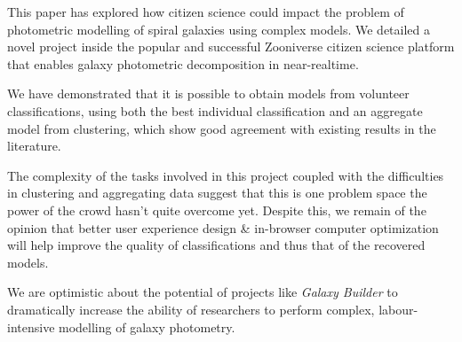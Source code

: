 \documentclass[../main.tex]{subfiles}
\begin{document}
\label{sec:conclusions}
This paper has explored how citizen science could impact the problem of photometric modelling of spiral galaxies using complex models. We detailed a novel project inside the popular and successful Zooniverse citizen science platform that enables galaxy photometric decomposition in near-realtime.

We have demonstrated that it is possible to obtain models from volunteer classifications, using both the best individual classification and an aggregate model from clustering, which show good agreement with existing results in the literature.

The complexity of the tasks involved in this project coupled with the difficulties in clustering and aggregating data suggest that this is one problem space the power of the crowd hasn't quite overcome yet. Despite this, we remain of the opinion that better user experience design \& in-browser computer optimization will help improve the quality of classifications and thus that of the recovered models.

We are optimistic about the potential of projects like \textit{Galaxy Builder} to dramatically increase the ability of researchers to perform complex, labour-intensive modelling of galaxy photometry.
\end{document}
